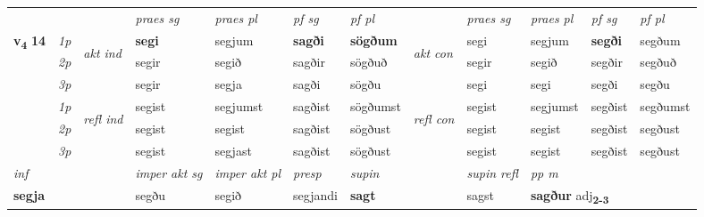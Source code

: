 \begin{longtable}[l]{X>{\footnotesize\itshape}llXXXXlXXXX}
 & &   & \textit{praes sg}  & \textit{praes pl}    & \textit{ pf sg} & \textit{pf pl} & & \textit{praes sg}  & \textit{praes pl}    & \textit{pf sg} & \textit{pf pl }  \\ \cmidrule{4-7} \cmidrule{9-12}
 \multirow{2}{*}{{{\textbf{v{\textsubscript{4}}} \Large{\textbf{14}}}}}  & 1p & \multirow{3}{*}{\begin{turn}{90}\textit{akt ind}\end{turn}} & \textbf{segi} & segjum & \textbf{sagði} & \textbf{sögðum} & \multirow{3}{*}{\begin{turn}{90}\textit{akt con}\end{turn}} &segi & segjum & \textbf{segði} & segðum\\*
 & 2p &  &  segir  & segið & sagðir & sögðuð & & segir & segið & segðir & segðuð \\*
 & 3p &  & segir & segja & sagði & sögðu & & segi & segi& segði & segðu \\*
\cmidrule{4-7} \cmidrule{9-12}
 & 1p & \multirow{3}{*}{\begin{turn}{90}\textit{refl ind}\end{turn}}  & segist & segjumst & sagðist & sögðumst & \multirow{3}{*}{\begin{turn}{90}\textit{refl con}\end{turn}}  &segist & segjumst & segðist & segðumst \\*
 & 2p &  & segist & segist & sagðist & sögðust & &segist & segist & segðist & segðust \\*
 & 3p  & & segist & segjast & sagðist & sögðust & & segist & segist& segðist & segðust \\*
\cmidrule{4-7} \cmidrule{9-12}

   {\textit{inf}} & &  & \textit{imper akt sg} & \textit{imper akt pl}   & \textit{presp} & \textit{supin} && \textit{supin refl} & \textit{pp m} \\*
  {\textbf{segja}} & && segðu  & segið   & segjandi &  \textbf{sagt} && sagst & \multicolumn{2}{l}{\textbf{sagður} adj\textbf{\textsubscript{2-3}}} \\*

\midrule


\end{longtable}
